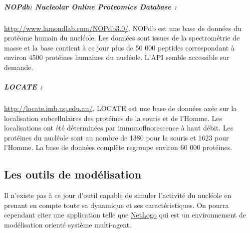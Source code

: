 \subparagraph{NOPdb: Nucleolar Online Proteomics Database \cite{Leung2006}: }
\url{http://www.lamondlab.com/NOPdb3.0/}. NOPdb est une base de données du
protéome humain du nucléole. Les données sont issues de la
spectrométrie de masse et la base contient à ce jour plus de 50 000
peptides correspondant à environ 4500 protéines humaines du
nucléole. L'API semble accessible sur demande.

\subparagraph{LOCATE \cite{Sprenger2007}: }
\url{http://locate.imb.uq.edu.au/}. LOCATE est une base de données
axée sur la localisation subcellulaires des protéines de la souris et
de l'Homme. Les localisations ont été déterminées par
immunofluorescence à haut débit. Les protéines du nucléole sont au
nombre de 1380 pour la souris et 1623 pour l'Homme. La base de données
complète regroupe environ 60 000 protéines.

\subsection{Les outils de modélisation}

Il n'existe pas à ce jour d'outil capable de simuler l'activité du
nucléole en prenant en compte toute sa dynamique et ses
caractéristiques. On pourra cependant citer une application telle que
\href{http://ccl.northwestern.edu/netlogo/}{NetLogo} \cite{Sklar2007}
qui est un environnement de modélisation orienté système multi-agent.

